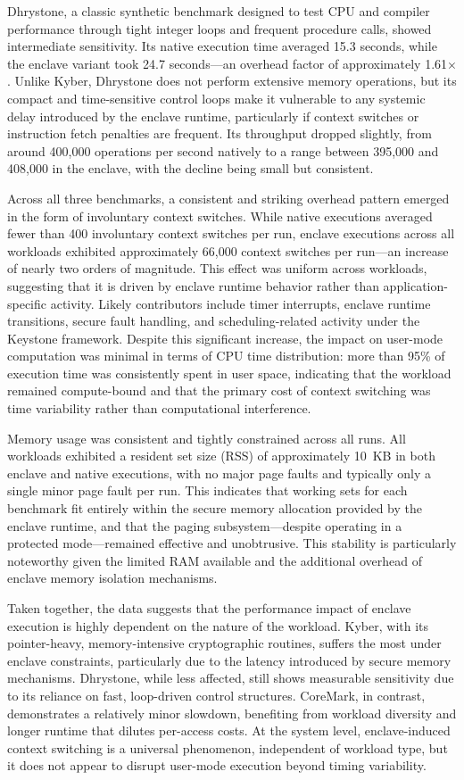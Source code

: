 Dhrystone, a classic synthetic benchmark designed to test CPU and compiler performance through tight integer loops and frequent procedure calls, showed intermediate sensitivity. Its native execution time averaged 15.3 seconds, while the enclave variant took 24.7 seconds—an overhead factor of approximately 1.61$\times$. Unlike Kyber, Dhrystone does not perform extensive memory operations, but its compact and time-sensitive control loops make it vulnerable to any systemic delay introduced by the enclave runtime, particularly if context switches or instruction fetch penalties are frequent. Its throughput dropped slightly, from around 400,000 operations per second natively to a range between 395,000 and 408,000 in the enclave, with the decline being small but consistent.

Across all three benchmarks, a consistent and striking overhead pattern emerged in the form of involuntary context switches. While native executions averaged fewer than 400 involuntary context switches per run, enclave executions across all workloads exhibited approximately 66,000 context switches per run—an increase of nearly two orders of magnitude. This effect was uniform across workloads, suggesting that it is driven by enclave runtime behavior rather than application-specific activity. Likely contributors include timer interrupts, enclave runtime transitions, secure fault handling, and scheduling-related activity under the Keystone framework. Despite this significant increase, the impact on user-mode computation was minimal in terms of CPU time distribution: more than 95\% of execution time was consistently spent in user space, indicating that the workload remained compute-bound and that the primary cost of context switching was time variability rather than computational interference.

Memory usage was consistent and tightly constrained across all runs. All workloads exhibited a resident set size (RSS) of approximately 10~KB in both enclave and native executions, with no major page faults and typically only a single minor page fault per run. This indicates that working sets for each benchmark fit entirely within the secure memory allocation provided by the enclave runtime, and that the paging subsystem—despite operating in a protected mode—remained effective and unobtrusive. This stability is particularly noteworthy given the limited RAM available and the additional overhead of enclave memory isolation mechanisms.

Taken together, the data suggests that the performance impact of enclave execution is highly dependent on the nature of the workload. Kyber, with its pointer-heavy, memory-intensive cryptographic routines, suffers the most under enclave constraints, particularly due to the latency introduced by secure memory mechanisms. Dhrystone, while less affected, still shows measurable sensitivity due to its reliance on fast, loop-driven control structures. CoreMark, in contrast, demonstrates a relatively minor slowdown, benefiting from workload diversity and longer runtime that dilutes per-access costs. At the system level, enclave-induced context switching is a universal phenomenon, independent of workload type, but it does not appear to disrupt user-mode execution beyond timing variability.

